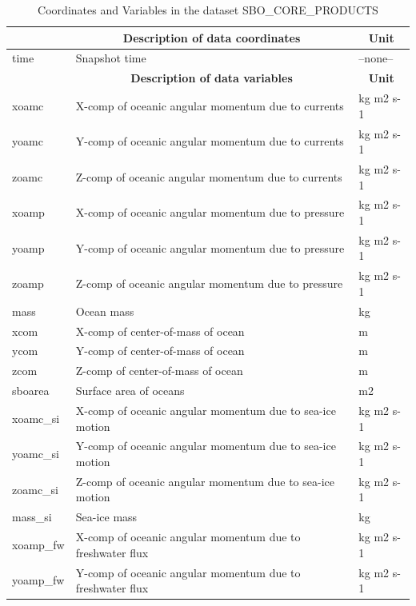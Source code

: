 \begin{longtable}{|m{}|m{}|m{}|}
\caption{Coordinates and Variables in the dataset SBO\_CORE\_PRODUCTS}
\label{tab:table-SBO_CORE_PRODUCTS-fields} \\ 
\hline \endhead \hline \endfoot
\rowcolor{lightgray} \multicolumn{1}{|c|}{\textbf{Coordinates}} & \multicolumn{1}{|c|}{\textbf{Description of data coordinates}} &  \multicolumn{1}{|c|}{\textbf{Unit}}\\ \hline
time &Snapshot time &--none--  \\ \hline
\rowcolor{lightgray} \multicolumn{1}{|c|}{\textbf{Variables}} & \multicolumn{1}{|c|}{\textbf{Description of data variables}} &  \multicolumn{1}{|c|}{\textbf{Unit}}\\ \hline
xoamc &X-comp of oceanic angular momentum due to currents &kg m2 s-1  \\ \hline
yoamc &Y-comp of oceanic angular momentum due to currents &kg m2 s-1  \\ \hline
zoamc &Z-comp of oceanic angular momentum due to currents &kg m2 s-1  \\ \hline
xoamp &X-comp of oceanic angular momentum due to pressure &kg m2 s-1  \\ \hline
yoamp &Y-comp of oceanic angular momentum due to pressure &kg m2 s-1  \\ \hline
zoamp &Z-comp of oceanic angular momentum due to pressure &kg m2 s-1  \\ \hline
mass &Ocean mass &kg  \\ \hline
xcom &X-comp of center-of-mass of ocean &m  \\ \hline
ycom &Y-comp of center-of-mass of ocean &m  \\ \hline
zcom &Z-comp of center-of-mass of ocean &m  \\ \hline
sboarea &Surface area of oceans &m2  \\ \hline
xoamc\_si &X-comp of oceanic angular momentum due to sea-ice motion &kg m2 s-1  \\ \hline
yoamc\_si &Y-comp of oceanic angular momentum due to sea-ice motion &kg m2 s-1  \\ \hline
zoamc\_si &Z-comp of oceanic angular momentum due to sea-ice motion &kg m2 s-1  \\ \hline
mass\_si &Sea-ice mass &kg  \\ \hline
xoamp\_fw &X-comp of oceanic angular momentum due to freshwater flux &kg m2 s-1  \\ \hline
yoamp\_fw &Y-comp of oceanic angular momentum due to freshwater flux &kg m2 s-1  \\ \hline

\end{longtable}
